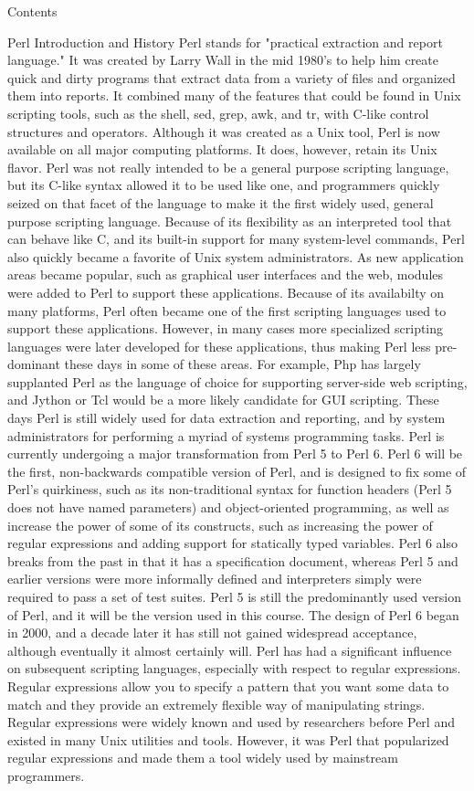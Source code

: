 Contents


Perl Introduction and History
Perl stands for "practical extraction and report language." It was created by Larry Wall in the mid 1980's to help him create quick and dirty programs that extract data from a variety of files and organized them into reports. It combined many of the features that could be found in Unix scripting tools, such as the shell, sed, grep, awk, and tr, with C-like control structures and operators. Although it was created as a Unix tool, Perl is now available on all major computing platforms. It does, however, retain its Unix flavor. 
Perl was not really intended to be a general purpose scripting language, but its C-like syntax allowed it to be used like one, and programmers quickly seized on that facet of the language to make it the first widely used, general purpose scripting language. Because of its flexibility as an interpreted tool that can behave like C, and its built-in support for many system-level commands, Perl also quickly became a favorite of Unix system administrators. As new application areas became popular, such as graphical user interfaces and the web, modules were added to Perl to support these applications. Because of its availabilty on many platforms, Perl often became one of the first scripting languages used to support these applications. However, in many cases more specialized scripting languages were later developed for these applications, thus making Perl less pre-dominant these days in some of these areas. For example, Php has largely supplanted Perl as the language of choice for supporting server-side web scripting, and Jython or Tcl would be a more likely candidate for GUI scripting. 
These days Perl is still widely used for data extraction and reporting, and by system administrators for performing a myriad of systems programming tasks. Perl is currently undergoing a major transformation from Perl 5 to Perl 6. Perl 6 will be the first, non-backwards compatible version of Perl, and is designed to fix some of Perl's quirkiness, such as its non-traditional syntax for function headers (Perl 5 does not have named parameters) and object-oriented programming, as well as increase the power of some of its constructs, such as increasing the power of regular expressions and adding support for statically typed variables. Perl 6 also breaks from the past in that it has a specification document, whereas Perl 5 and earlier versions were more informally defined and interpreters simply were required to pass a set of test suites. Perl 5 is still the predominantly used version of Perl, and it will be the version used in this course. The design of Perl 6 began in 2000, and a decade later it has still not gained widespread acceptance, although eventually it almost certainly will. 
Perl has had a significant influence on subsequent scripting languages, especially with respect to regular expressions. Regular expressions allow you to specify a pattern that you want some data to match and they provide an extremely flexible way of manipulating strings. Regular expressions were widely known and used by researchers before Perl and existed in many Unix utilities and tools. However, it was Perl that popularized regular expressions and made them a tool widely used by mainstream programmers. 

